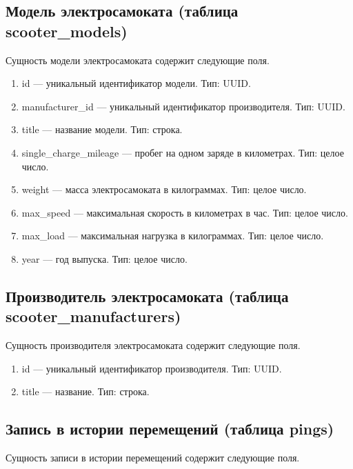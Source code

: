 \subsection{Модель электросамоката (таблица scooter\_models)}

Сущность модели электросамоката содержит следующие поля.

\begin{enumerate}
    \item id --- уникальный идентификатор модели. Тип: UUID.
    \item manufacturer\_id --- уникальный идентификатор производителя. Тип: UUID.
    \item title --- название модели. Тип: строка.
    \item single\_charge\_mileage --- пробег на одном заряде в километрах. Тип: целое число.
    \item weight --- масса электросамоката в килограммах. Тип: целое число.
    \item max\_speed --- максимальная скорость в километрах в час. Тип: целое число.
    \item max\_load --- максимальная нагрузка в килограммах. Тип: целое число.
    \item year --- год выпуска. Тип: целое число.
\end{enumerate}

\subsection{Производитель электросамоката (таблица scooter\_manufacturers)}

Сущность производителя электросамоката содержит следующие поля.

\begin{enumerate}
    \item id --- уникальный идентификатор производителя. Тип: UUID.
    \item title --- название. Тип: строка.
\end{enumerate}

\subsection{Запись в истории перемещений (таблица pings)}

Сущность записи в истории перемещений содержит следующие поля.

